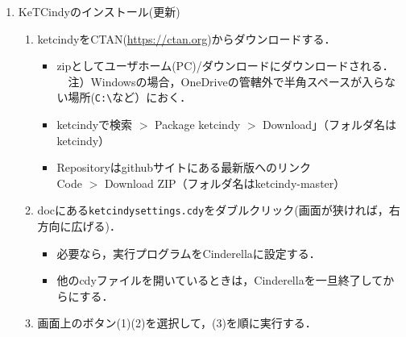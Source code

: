 \documentclass{ujarticle}
\begin{document}
\begin{enumerate}[\bf\large 1.]
\item KeTCindyのインストール(更新)\vspace{-2mm}
  \begin{enumerate}[(1)]
  \item ketcindyをCTAN(\url{https://ctan.org})からダウンロードする．
    \begin{itemize}
     \item zipとしてユーザホーム(PC)/ダウンロードにダウンロードされる．\\
　注）Windowsの場合，{\color{red}OneDriveの管轄外で半角スペースが入らない場所(\verb|C:\|など）}におく．
     \item ketcindyで検索 $>$ Package ketcindy $>$ Download」（フォルダ名はketcindy）
     \item Repositoryはgithubサイトにある{\color{red}最新版}へのリンク\\
        \hspace*{10mm}Code $>$ Download ZIP（フォルダ名はketcindy-master）
     \end{itemize}
  \item docにある\verb|ketcindysettings.cdy|をダブルクリック(画面が狭ければ，右方向に広げる)．
    \begin{itemize}
    \item 必要なら，実行プログラムをCinderellaに設定する．
    \item 他のcdyファイルを開いているときは，Cinderellaを一旦終了してからにする．

   \end{itemize}
  \item 画面上のボタン(1)(2)を選択して，(3)を順に実行する．
  \end{enumerate}



\end{enumerate}
\end{document}
